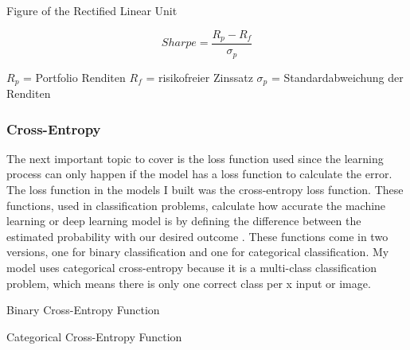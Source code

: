 \documentclass[12pt]{article}
\begin{document}
                Figure of the Rectified Linear Unit \cite{agarap2019}
            

                \begin{multicols}{2}
                    
                    \begin{Large} \[ Sharpe = \frac{R_p - R_f}{\sigma_p} \] \end{Large}

                    \vfill

                    \begin{small}

                        \noindent $R_p$ = Portfolio Renditen \newline 
                        $R_f$ = risikofreier Zinssatz \newline 
                        $\sigma_p$ = Standardabweichung der Renditen 

                    \end{small}

                \end{multicols}

            
                
            \subsubsection{Cross-Entropy}
                
                The next important topic to cover is the loss function used since the learning process can only happen 
                if the model has a loss function to calculate the error. 
                The loss function in the models I built was the cross-entropy loss function. 
                These functions, used in classification problems, calculate how accurate the machine learning 
                or deep learning model is by defining the difference between the estimated probability 
                with our desired outcome \cite{365team2023}. These functions come in two versions, 
                one for binary classification and one for categorical classification. 
                My model uses categorical cross-entropy because it is a multi-class classification problem, 
                which means there is only one correct class per x input or image.

                Binary Cross-Entropy Function
                
                Categorical Cross-Entropy Function
                
\end{document}
